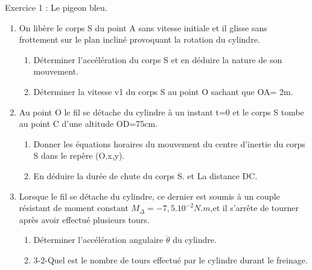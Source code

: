 \documentclass[12pt, french]{article}
\begin{document}
\begin{Box2}{Exercice 1 : Le pigeon bleu.}
\begin{enumerate}
	\item On libère le corps S du point A sans vitesse initiale et il glisse sans frottement sur le plan incliné provoquant la rotation du
cylindre. 
    \begin{enumerate}
        \item Déterminer l'accélération du corps S et en déduire la nature de son mouvement.
        \item Déterminer la vitesse v1 du corps S au point O sachant que OA= 2m.
    \end{enumerate}
\item Au point O le fil se détache du cylindre à un instant t=0 et le corps S tombe au point C d'une altitude OD=75cm. 
    \begin{enumerate}
        \item Donner les équations horaires du mouvement du centre d'inertie du corps S dans le repère (O,x,y).
        \item En déduire la durée de chute du corps S. et La distance DC.
    \end{enumerate}
\item Lorsque le fil se détache du cylindre, ce dernier est soumis à un couple résistant de moment constant $M_{\Delta} = -7,5.10^{-2}N.m$,et il s'arrête de tourner après avoir effectué plusieurs tours. 
\begin{enumerate}
    \item Déterminer l'accélération angulaire $\ddot{\theta}$ du cylindre. 
	\item 3-2-Quel est le nombre de tours effectué par le cylindre durant le freinage.
\end{enumerate}
\end{enumerate}


   \end{Box2}
\end{document}
